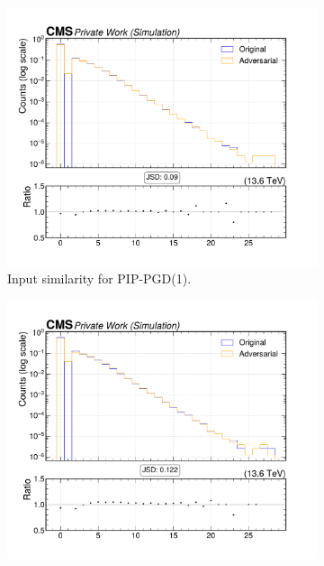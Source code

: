 \begin{figure}[htbp]
  \centering
  \begin{subfigure}[t]{0.32\textwidth}
    \includegraphics[width=\linewidth]{media/output/features/compare/combined_it_1/cmp_global_features_TagVarCSV_jetNTracksEtaRel.pdf}
    \caption*{Input similarity for PIP-PGD(1).}
  \end{subfigure}\hfill
  \begin{subfigure}[t]{0.32\textwidth}
    \includegraphics[width=\linewidth]{media/output/features/compare/combined_it_2/cmp_global_features_TagVarCSV_jetNTracksEtaRel.pdf}

\end{subfigure}
\end{figure}
